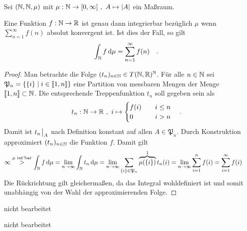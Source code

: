 \documentclass{anablatt}
\begin{document}
\makeheader
\task
Sei $(\mathbb{N}, \mathbb{N}, \mu)$ mit $\mu: \mathbb{N} \rightarrow [0,\infty] ~,~ A \mapsto |A|$ ein Maßraum.
\begin{theorem}
Eine Funktion $f:\mathbb{N} \rightarrow \mathbb{R}$ ist genau dann integrierbar bezüglich $\mu$ wenn $\sum_{n=1}^\infty f(n)$ absolut konvergent ist. Ist dies der Fall, so gilt
\[ \int_\N f\dd\mu = \sum_{n=1}^\infty f(n)  \quad.\]
\end{theorem}
\begin{proof}
Man betrachte die Folge $(t_n)_{n\in\mathbb{N}} \in T(\mathbb{N},\mathbb{R})^{\mathbb{N}}$. Für alle $n \in \mathbb{N}$ sei $\mathfrak P_n = \{\{i\} \mid i \in \left\llbracket 1,n \right\rrbracket\}$ eine Partition von messbaren Mengen der Menge $\left\llbracket 1,n \right\rrbracket \subset \mathbb{N}$. Die entsprechende Treppenfunktion $t_n$ soll gegeben sein als
\[
    t_n: \mathbb{N} \rightarrow \mathbb{R} ~,~
    i \mapsto \begin{cases}
        f(i) \quad & i \leq n \\
           0 \quad & i > n
       \end{cases} \quad.
\]
Damit ist $t_n\eval_A$ nach Definition konstant auf allen $A \in \mathfrak P_n$. Durch Konstruktion approximiert $(t_n)_{n\in\mathbb{N}}$ die Funktion $f$. Damit gilt
\begin{align*}
    \infty \stackrel{\mu\text{ int'bar}}> \int_\N f\dd\mu
    &= \lim_{n \rightarrow \infty} \int_\N t_n\dd\mu 
    = \lim_{n \rightarrow \infty} \sum_{\{i\}\in\mathfrak P_n} \overbrace{\mu(\{i\})}^1t_n(i)
    = \lim_{n \rightarrow \infty} \sum_{i=1}^n f(i)
    = \sum_{i=1}^\infty f(i)
\end{align*}
Die Rückrichtung gilt gleichermaßen, da das Integral wohldefiniert ist und somit unabhängig von der Wahl der approximierenden Folge.
\end{proof}

\task nicht bearbeitet

\task nicht bearbeitet
\end{document}
